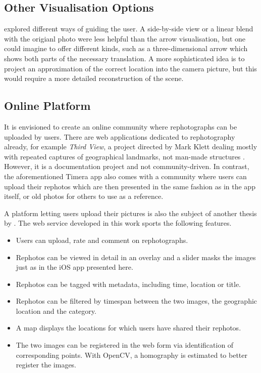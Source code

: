 \subsection*{Other Visualisation Options}\label{subsec:alternative_visualisation}

\citet{bae2010} explored different ways of guiding the user.  A side-by-side
view or a linear blend with the origianl photo were less helpful than the arrow
visualisation, but one could imagine to offer different kinds, such as a
three-dimensional arrow which shows both parts of the necessary translation. A
more sophisticated idea is to project an approximation of the correct location
into the camera picture, but this would require a more detailed reconstruction
of the scene.

\subsection*{Online Platform}

It is envisioned to create an online community where
rephotographs can be uploaded by users.  There are web applications dedicated to
rephotography already, for example \emph{Third View}, a project directed by Mark
Klett dealing mostly with repeated captures of geographical landmarks, not
man-made structures \citep{thirdview}. However, it is a documentation project
and not community-driven. In contrast, the aforementioned Timera app also comes
with a community where users can upload their rephotos which are then presented
in the same fashion as in the app itself, or old photos for others to use as a
reference.

A platform letting users upload their pictures is also the subject of another
thesis by \citet{weber2015}. The web service developed in this work sports the
following features.

\begin{itemize}
   \item Users can upload, rate and comment on rephotographs.
   \item Rephotos can be viewed in detail in an overlay and a slider masks the
      images just as in the iOS app presented here.
    \item Rephotos can be tagged with metadata, including time, location or
       title.
    \item Rephotos can be filtered by timespan between the two images, the
       geographic location and the category.
    \item A map displays the locations for which users have shared their
       rephotos.
    \item The two images can be registered in the web form via identification of
       corresponding points. With OpenCV, a homography is estimated to better
       register the images.
\end{itemize}

